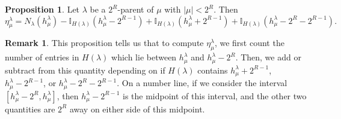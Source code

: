 \documentclass[12pt]{amsart}
\theoremstyle{definition}
\newtheorem{remark}[theorem]{Remark}
\newtheorem{proposition}[theorem]{Proposition}
\numberwithin{equation}{section}
\newcommand{\la}{\lambda}
\begin{document}
\begin{proposition}\label{prop:inversions}
Let $\lambda$ be a $2^R$-parent of $\mu$ with $|\mu| < 2^R$.  Then
\[
\eta^{\lambda}_{\mu} = N_{\lambda}(h^\lambda_\mu) - \mathbb{I}_{H(\lambda)}(h^\lambda_\mu - 2^{R-1}) +  \mathbb{I}_{H(\lambda)}(h^\lambda_\mu + 2^{R-1}) + \mathbb{I}_{H(\lambda)}(h^\lambda_\mu - 2^R-2^{R-1}). 
\]
\end{proposition}
\begin{remark}
   This proposition tells us that to compute $\eta^\lambda_\mu$, we first count the number of entries in $H(\lambda)$ which lie between $h^\lambda_\mu$ and $h^\lambda_\mu - 2^R$. Then, we add or subtract from this quantity depending on if $H(\lambda)$ contains $h^\lambda_\mu + 2^{R-1}$, $h^\lambda_\mu - 2^{R-1}$,  or $h^\lambda_\mu - 2^R - 2^{R-1}$. On a number line, if we consider the interval $[h^\la_\mu-2^R, h^\la_\mu]$, then $h^\la_\mu - 2^{R-1}$ is the midpoint of this interval, and the other two quantities are $2^R$ away on either side of this midpoint. 
\end{remark}
\end{document}
